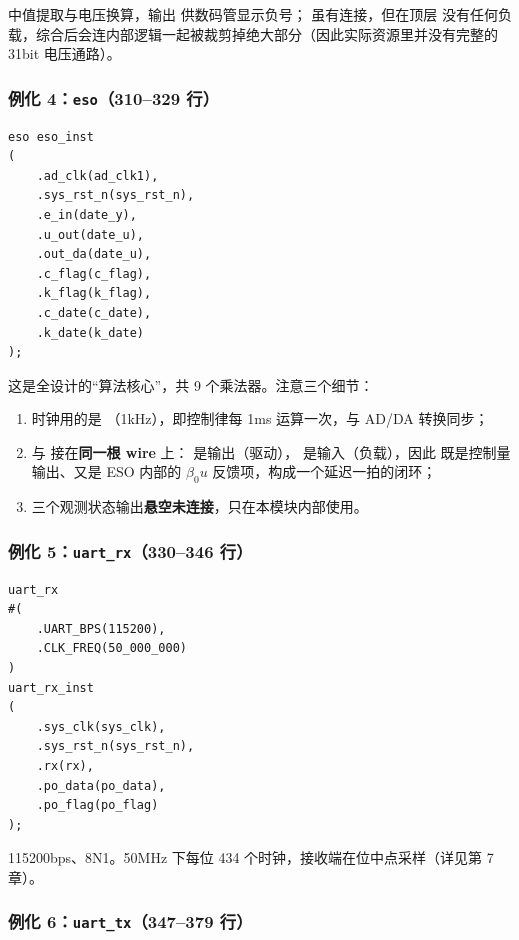 中值提取与电压换算，输出  供数码管显示负号； 虽有连接，但在顶层
没有任何负载，综合后会连内部逻辑一起被裁剪掉绝大部分（因此实际资源里并没有完整的
31bit 电压通路）。

\subsubsection{例化 4：\texttt{eso}（310--329 行）}

\begin{lstlisting}[style=vsnip]
eso eso_inst
(
    .ad_clk(ad_clk1),
    .sys_rst_n(sys_rst_n),
    .e_in(date_y),
    .u_out(date_u),
    .out_da(date_u),
    .c_flag(c_flag),
    .k_flag(k_flag),
    .c_date(c_date),
    .k_date(k_date)
);
\end{lstlisting}

这是全设计的“算法核心”，共 9 个乘法器。注意三个细节：

\begin{enumerate}[leftmargin=2em,itemsep=2pt]
\item 时钟用的是 （1kHz），即控制律每 1ms 运算一次，与 AD/DA 转换同步；
\item {} 与  接在\textbf{同一根 wire}  上：
       是输出（驱动）， 是输入（负载），因此 
      既是控制量输出、又是 ESO 内部的 $\beta_0 u$ 反馈项，构成一个延迟一拍的闭环；
\item {} 三个观测状态输出\textbf{悬空未连接}，只在本模块内部使用。
\end{enumerate}

\subsubsection{例化 5：\texttt{uart\_rx}（330--346 行）}

\begin{lstlisting}[style=vsnip]
uart_rx
#(
    .UART_BPS(115200),
    .CLK_FREQ(50_000_000)
)
uart_rx_inst
(
    .sys_clk(sys_clk),
    .sys_rst_n(sys_rst_n),
    .rx(rx),
    .po_data(po_data),
    .po_flag(po_flag)
);
\end{lstlisting}

115200bps、8N1。50MHz 下每位 434 个时钟，接收端在位中点采样（详见第 7 章）。

\subsubsection{例化 6：\texttt{uart\_tx}（347--379 行）}

